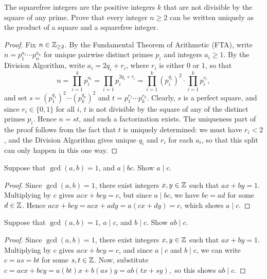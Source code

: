\documentclass{article}
\begin{document}
\begin{exercise}
The squarefree integers are the positive integers $k$ that are not divisible by the square of any prime. Prove that every integer $n\geq 2$ can be written uniquely as the product of a square and a squarefree integer.
\end{exercise}
\begin{proof}
Fix $n\in\mathbb Z_{\geq 2}$. By the Fundamental Theorem of Arithmetic (FTA), write $n = p_1^{a_1}\cdots p_n^{a_k}$ for unique pairwise distinct primes $p_i$ and integers $a_i \geq 1$. By the Division Algorithm, write $a_i = 2q_i + r_i$, where $r_i$ is either $0$ or $1$, so that
$$n = \prod_{i=1}^k p_i^{a_i} = \prod_{i=1}p_i^{2q_i+r_i} = \prod_{i=1}^k(p_i^{q_i})^2 \cdot \prod_{i=1}^k p_i^{r_i},$$
and set $s = (p_1^{q_1})^2\cdots (p_k^{q_k})^2$ and $t = p_1^{r_1}\cdots p_k^{r_k}$. Clearly, $s$ is a perfect square, and since $r_i\in\{0, 1\}$ for all $i$, $t$ is not divisible by the square of any of the distinct primes $p_i$. Hence $n=st$, and such a factorization exists. The uniqueness part of the proof follows from the fact that $t$ is uniquely determined: we must have $r_i < 2$, and the Division Algorithm gives unique $q_i$ and $r_i$ for each $a_i$, so that this split can only happen in this one way.
\end{proof}

\begin{exercise}[Chapter 7, \#1]
Suppose that $\gcd(a,b) = 1$, and $a\mid bc$. Show $a\mid c$.
\end{exercise}
\begin{proof}
Since $\gcd(a,b) = 1$, there exist integers $x,y\in\mathbb Z$ such that $ax + by = 1$. Multiplying by $c$ gives $acx + bcy = c$, but since $a\mid bc$, we have $bc = ad$ for some $d\in \mathbb Z$. Hence $acx + bcy = acx + ady = a(cx+dy) = c$, which shows $a\mid c$.
\end{proof}

\begin{exercise}[Chapter 7, \#2]
Suppose that $\gcd(a,b) = 1$, $a\mid c$, and $b\mid c$. Show $ab\mid c$.
\end{exercise}
\begin{proof}
Since $\gcd(a, b) = 1$, there exist integers $x,y\in\mathbb Z$ such that $ax + by = 1$. Multiplying by $c$ gives $acx + bcy = c$, and since $a\mid c$ and $b\mid c$, we can write $c = as = bt$ for some $s, t\in \mathbb Z$. Now, substitute $c = acx + bcy = a(bt)x + b(as)y = ab(tx + sy),$
so this shows $ab\mid c$.
\end{proof}
\end{document}
